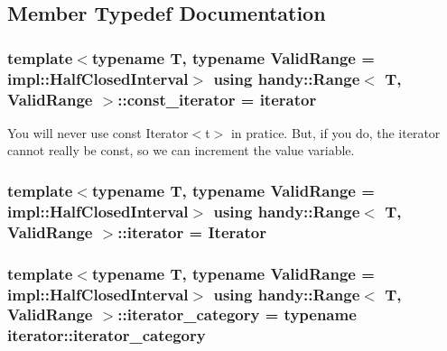 \subsection{Member Typedef Documentation}
\subsubsection[{\texorpdfstring{const\+\_\+iterator}{const_iterator}}]{\setlength{\rightskip}{0pt plus 5cm}template$<$typename T, typename Valid\+Range = impl\+::\+Half\+Closed\+Interval$>$ using {\bf handy\+::\+Range}$<$ T, Valid\+Range $>$\+::{\bf const\+\_\+iterator} =  {\bf iterator}}\hypertarget{classhandy_1_1Range_a776521ae1ca6a10d1be256ecdf26f6e2}{}\label{classhandy_1_1Range_a776521ae1ca6a10d1be256ecdf26f6e2}
You will never use \textquotesingle{}const Iterator$<$t$>$\textquotesingle{} in pratice. But, if you do, the iterator cannot really be const, so we can increment the \textquotesingle{}value\textquotesingle{} variable. 
\subsubsection[{\texorpdfstring{iterator}{iterator}}]{\setlength{\rightskip}{0pt plus 5cm}template$<$typename T, typename Valid\+Range = impl\+::\+Half\+Closed\+Interval$>$ using {\bf handy\+::\+Range}$<$ T, Valid\+Range $>$\+::{\bf iterator} =  {\bf Iterator}}\hypertarget{classhandy_1_1Range_ad879bbe314ce7bcffdda15a0f065e0f8}{}\label{classhandy_1_1Range_ad879bbe314ce7bcffdda15a0f065e0f8}
\subsubsection[{\texorpdfstring{iterator\+\_\+category}{iterator_category}}]{\setlength{\rightskip}{0pt plus 5cm}template$<$typename T, typename Valid\+Range = impl\+::\+Half\+Closed\+Interval$>$ using {\bf handy\+::\+Range}$<$ T, Valid\+Range $>$\+::{\bf iterator\+\_\+category} =  typename {\bf iterator\+::iterator\+\_\+category}}\hypertarget{classhandy_1_1Range_a9d4a18bcffddb19f6dcc2d9088fd5219}{}\label{classhandy_1_1Range_a9d4a18bcffddb19f6dcc2d9088fd5219}

